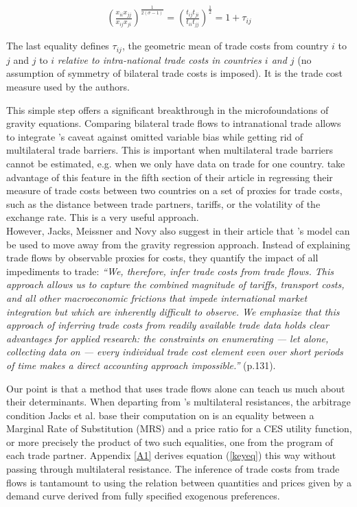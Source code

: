 \documentclass{article}
\begin{document}
\begin{eqnarray}
\left( \frac{x_{ii} x_{jj}}{x_{ij} x_{ji}}\right)^{\frac{1}{2(\sigma-1)}} =\left(\frac{t_{ij} t_{ji}}{t_{ii} t_{jj}} \right)^{\frac{1}{2}} = 1+\tau_{ij} \label{keyeq}
\end{eqnarray}

The last equality defines $\tau_{ij}$, the geometric mean
of trade costs from country $i$ to $j$ and $j$ to $i$
\emph{relative to intra-national trade costs in countries $i$
and $j$} (no assumption of symmetry of bilateral trade costs is
imposed). It is the trade cost measure used by the authors.

This simple step offers a significant breakthrough in the
microfoundations of gravity equations. Comparing bilateral
trade flows to intranational trade allows to integrate
\cite{AW2003}'s caveat against omitted variable bias while
getting rid of multilateral trade barriers. This is important
when multilateral trade barriers cannot be estimated, e.g. when
we only have data on trade for one country. \cite{JMN2011} take
advantage of this feature in the fifth section of their article in
regressing their measure of trade costs between two countries
on a set of proxies for trade costs, such as the distance
between trade partners, tariffs, or the volatility of the
exchange rate. This is a very useful approach.\\

However, Jacks, Meissner and Novy also suggest in their article that
\cite{AW2003}'s model can be used to move away from the gravity
regression approach. Instead of explaining trade flows by
observable proxies for costs, they quantify the impact of all
impediments to trade: \emph{``We, therefore, infer trade costs
from trade flows. This approach allows us to capture the
combined magnitude of tariffs, transport costs, and all other
macroeconomic frictions that impede international market
integration but which are inherently difficult to observe. We
emphasize that this approach of inferring trade costs from
readily available trade data holds clear advantages for applied
research: the constraints on enumerating — let alone,
collecting data on — every individual trade cost element
even over short periods of time makes a direct accounting
approach impossible.''} (p.131).

Our point is that a method that uses trade flows
alone can teach us much about their determinants. When
departing from \cite{AW2003}'s multilateral resistances, the
arbitrage condition Jacks et al. base their computation on is an
equality between a Marginal Rate of Substitution (MRS) and a
price ratio for a CES utility function, or more precisely the
product of two such equalities, one from the program of each
trade partner. Appendix \ref{A1} derives equation (\ref{keyeq})
this way without passing through multilateral resistance. The
inference of trade costs from trade flows is tantamount to
using the relation between quantities and prices given by a
demand curve derived from fully specified exogenous
preferences.
\end{document}
